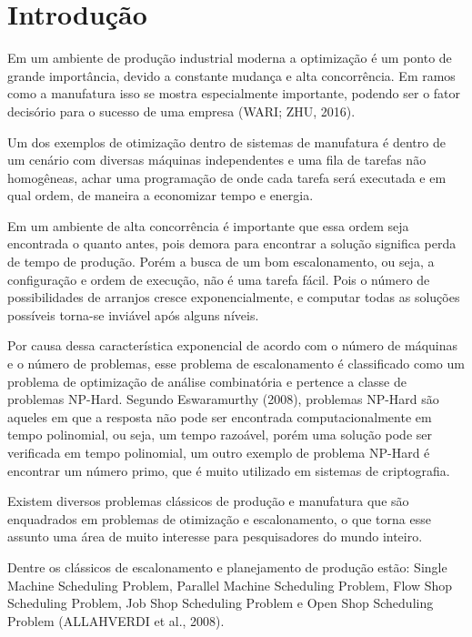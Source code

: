 \chapter{Introdução}
Em um ambiente de produção industrial moderna a optimização é um ponto de grande importância, devido a constante mudança e alta concorrência. Em ramos como a manufatura isso se mostra especialmente importante, podendo ser o fator decisório para o sucesso de uma empresa  (WARI; ZHU, 2016).\newline

Um dos exemplos de otimização dentro de sistemas de manufatura é dentro de um cenário com diversas máquinas independentes e uma fila de tarefas não homogêneas, achar uma programação de onde cada tarefa será executada e em qual ordem, de maneira a economizar tempo e energia.\newline

Em um ambiente de alta concorrência é importante que essa ordem seja encontrada o quanto antes, pois demora para encontrar a solução significa perda de tempo de produção. Porém a busca de um bom escalonamento, ou seja, a configuração e ordem de execução, não é uma tarefa fácil. Pois o número de possibilidades de arranjos cresce exponencialmente, e computar todas as soluções possíveis torna-se inviável após alguns níveis.\newline

Por causa dessa característica exponencial de acordo com o número de máquinas e o número de problemas, esse problema de escalonamento é classificado como um problema de optimização de análise combinatória e pertence a classe de problemas NP-Hard. Segundo Eswaramurthy (2008), problemas NP-Hard são aqueles em que a resposta não pode ser encontrada computacionalmente em tempo polinomial, ou seja, um tempo razoável, porém uma solução pode ser verificada em tempo polinomial, um outro exemplo de problema NP-Hard é encontrar um número primo, que é muito utilizado em sistemas de criptografia.\newline

Existem diversos problemas clássicos de produção e manufatura que são enquadrados em problemas de otimização e escalonamento, o que torna esse assunto uma área de muito interesse para pesquisadores do mundo inteiro.\newline

Dentre os clássicos de escalonamento e planejamento de produção estão: Single Machine Scheduling Problem, Parallel Machine Scheduling Problem, Flow Shop Scheduling Problem, Job Shop Scheduling Problem e Open Shop Scheduling Problem (ALLAHVERDI et al., 2008).\newline

